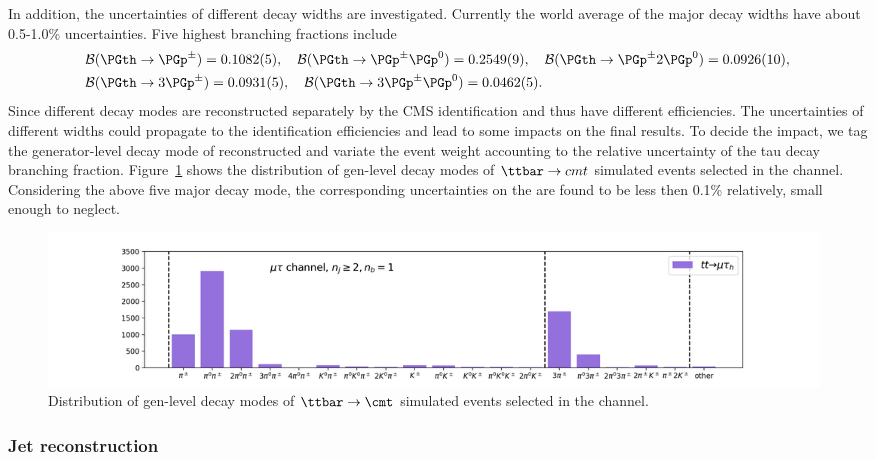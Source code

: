     In addition, the uncertainties of different \PGth decay widths are investigated. Currently the world average of the major \PGth decay widths have about 0.5-1.0\% uncertainties. Five highest \PGth branching fractions include 
    \begin{equation*}
    \begin{split}
    &   \mathcal{B}(\PGth\to \PGp^\pm)        = 0.1082(5), \quad 
        \mathcal{B}(\PGth\to \PGp^\pm \PGp^0)  = 0.2549(9), \quad 
        \mathcal{B}(\PGth\to \PGp^\pm2\PGp^0)  = 0.0926(10),\\
    &   \mathcal{B}(\PGth\to3\PGp^\pm)        = 0.0931(5), \quad
        \mathcal{B}(\PGth\to3\PGp^\pm \PGp^0)  = 0.0462(5).           
    \end{split}
    \end{equation*}
    \noindent Since different decay modes are reconstructed separately by the CMS \PGth identification and thus have different efficiencies. The uncertainties of different \PGth widths could propagate to the \PGth identification efficiencies and lead to some impacts on the final results. To decide the impact, we tag the generator-level decay mode of reconstructed \PGth and variate the event weight accounting to the relative uncertainty of the tau decay branching fraction. Figure~\ref{fig:analysis:systematics:tauhDecayMode} shows the distribution of gen-level \PGth decay modes of $\ttbar \to cmt$ simulated events selected in the \cmt channel. Considering the above five major \PGth decay mode, the corresponding uncertainties on the \BWl are found to be less then 0.1\% relatively, small enough to neglect.
    
    \begin{figure}
    \centering
    \includegraphics[width=0.99\textwidth]{chapters/Analysis/sectionSystematics/figures/tauBr/tauhDecay_mutau.png}
    \caption{Distribution of gen-level \PGth decay modes of $\ttbar \to \cmt$ simulated events selected in the \cmt channel.}
    \label{fig:analysis:systematics:tauhDecayMode}
\end{figure}




\subsubsection{Jet reconstruction}

